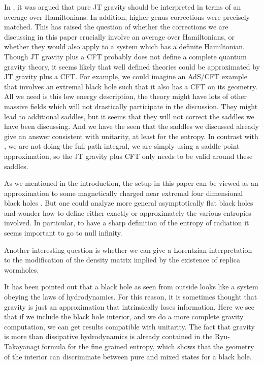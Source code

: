 In \cite{Saad:2019lba}, it was argued that pure JT gravity should be interpreted in terms of an average over Hamiltonians. In addition, higher genus corrections were precisely matched. 
This has raised the question of whether the corrections we are discussing in this paper crucially involve an average over Hamiltonians, or whether they would also apply to a system which has a definite Hamiltonian. 
Though JT gravity plus a CFT probably does not define a complete quantum gravity theory, it seems likely that well defined theories could be approximated by   JT gravity plus a CFT. For example, we could imagine an AdS/CFT example that involves an extremal black hole such that it also has a CFT on its geometry. All we need is this low energy description, the theory might have lots of other massive fields which will not drastically participate in the discussion. They might lead to additional saddles, but it seems that they will not correct the saddles we have been discussing. And we have the seen that the saddles we discussed already give an answer consistent with unitarity, at least for the entropy.  In contrast with \cite{Saad:2019lba}, we are not doing the full path integral, we are simply using a saddle point approximation, so the JT gravity plus CFT only needs to be valid around these saddles.
  
    
  As we mentioned in the introduction, the setup in this paper can be 
  viewed as an approximation to some magnetically charged near extremal four dimensional black holes \cite{Maldacena:2018gjk}. 
  But one could analyze more general asymptotically flat black holes and wonder how to define either exactly or approximately the various entropies involved. In particular, to have a sharp definition of the entropy of radiation it seems important to go to null infinity. 
    
  Another interesting question is whether we can give a Lorentzian interpretation to the modification of the density matrix implied by the existence of replica wormholes.  
    
 It has been pointed out that a black hole as seen from outside looks like a system obeying the laws of hydrodynamics. For this reason, it is sometimes thought that gravity is just an approximation that intrinsically loses information. Here we see that if we include the black hole interior, and we do a more complete gravity computation, we can get results compatible with unitarity. The fact that gravity is more than dissipative hydrodynamics is already contained in the Ryu-Takayanagi formula for the fine grained entropy, which shows that the geometry of the interior can discriminate between pure and mixed states for a black hole.  




